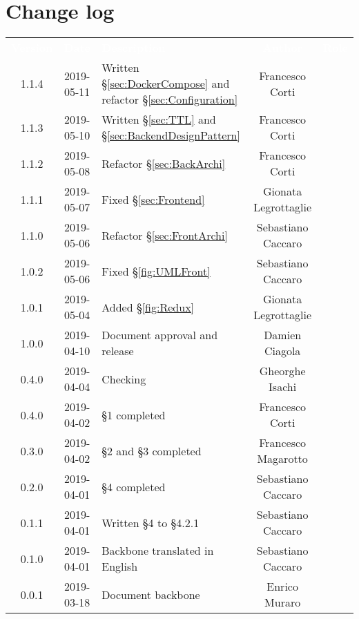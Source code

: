 \section*{Change log}
{
	\renewcommand{\arraystretch}{1.5}
	\centering
	\begin{longtable}{ c c C{6cm} c c }
		\textcolor{white}{\textbf{Version}} & \textcolor{white}{\textbf{Date}} & \textcolor{white}{\textbf{Description}} & \textcolor{white}{\textbf{Author}} & \textcolor{white}{\textbf{Role}}\\
		1.1.4 & 2019-05-11 & Written §\ref{sec:DockerCompose} and refactor §\ref{sec:Configuration} & Francesco Corti & \reda{}\\
		1.1.3 & 2019-05-10 & Written §\ref{sec:TTL} and §\ref{sec:BackendDesignPattern} & Francesco Corti & \reda{}\\
		1.1.2 & 2019-05-08 & Refactor §\ref{sec:BackArchi}  & Francesco Corti & \reda{}\\
		1.1.1 & 2019-05-07 & Fixed §\ref{sec:Frontend} & Gionata Legrottaglie & \reda{}\\
		1.1.0 & 2019-05-06 & Refactor §\ref{sec:FrontArchi} & Sebastiano Caccaro & \reda{}\\
		1.0.2 & 2019-05-06 & Fixed §\ref{fig:UMLFront} & Sebastiano Caccaro & \reda{}\\
		1.0.1 & 2019-05-04 & Added §\ref{fig:Redux} & Gionata Legrottaglie & \reda{}\\
		1.0.0 & 2019-04-10 & Document approval and release & Damien Ciagola & \RdP{}\\
		0.4.0 & 2019-04-04 & Checking & Gheorghe Isachi & \ver{}\\
		0.4.0 & 2019-04-02 & §1 completed  & Francesco Corti & \reda{}\\		
		0.3.0 & 2019-04-02 & §2 and §3 completed  & Francesco Magarotto & \reda{}\\				
		0.2.0 & 2019-04-01 & §4 completed  & Sebastiano Caccaro & \reda{}\\
		0.1.1 & 2019-04-01 & Written §4 to §4.2.1  & Sebastiano Caccaro & \reda{}\\
		0.1.0 & 2019-04-01 & Backbone translated in English & Sebastiano Caccaro & \reda{}\\
		0.0.1 & 2019-03-18 & Document backbone & Enrico Muraro & \reda{}\\
		
	\end{longtable}

}


